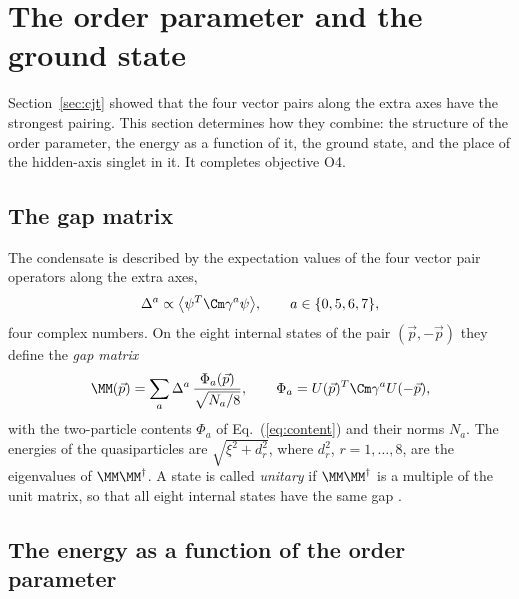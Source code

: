 
\section{The order parameter and the ground state}
\label{sec:order}

Section~\ref{sec:cjt} showed that the four vector pairs along the extra axes have the strongest
pairing. This section determines how they combine: the structure of the order parameter, the energy
as a function of it, the ground state, and the place of the hidden-axis singlet in it. It completes
objective O4.

\subsection{The gap matrix}

The condensate is described by the expectation values of the four vector pair operators along the
extra axes,
\begin{equation}
\Delta^a\propto\big\langle\psi^T\Cm\gamma^a\psi\big\rangle,\qquad a\in\{0,5,6,7\},
\label{eq:Deltaa}
\end{equation}
four complex numbers. On the eight internal states of the pair $(\vec p,-\vec p)$ they define the
\emph{gap matrix}
\begin{equation}
\MM(\vec p)=\sum_{a}\Delta^a\,\frac{\Phi_a(\vec p)}{\sqrt{N_a/8}},\qquad\Phi_a=U(\vec p)^T\Cm\gamma^aU(-\vec p),
\label{eq:gapmatrix}
\end{equation}
with the two-particle contents $\Phi_a$ of Eq.~(\ref{eq:content}) and their norms $N_a$. The energies
of the quasiparticles are $\sqrt{\xi^2+d_r^2}$, where $d_r^2$, $r=1,\dots,8$, are the eigenvalues of
$\MM\MM^\dagger$. A state is called \emph{unitary} if $\MM\MM^\dagger$ is a multiple of the unit
matrix, so that all eight internal states have the same gap \cite{Leggett1975}.

\subsection{The energy as a function of the order parameter}
\label{sec:GL}

